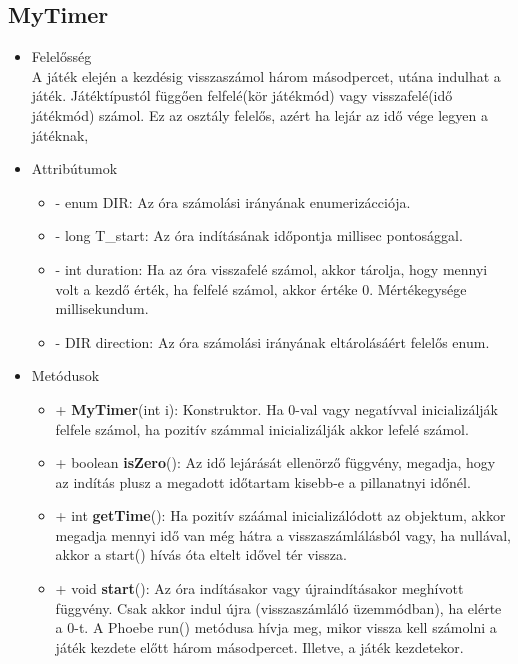 \subsection{MyTimer}
\begin{itemize}
\item Felelősség\\
A játék elején a kezdésig visszaszámol három másodpercet, utána indulhat a játék. Játéktípustól függően felfelé(kör játékmód) vagy visszafelé(idő játékmód) számol. Ez az osztály felelős, azért ha lejár az idő vége legyen a játéknak,
\item Attribútumok
    \begin{itemize}
        \item - enum DIR: Az óra számolási irányának enumerizácciója.
        \item - long T\_start: Az óra indításának időpontja millisec pontosággal.
	    \item - int duration: Ha az óra visszafelé számol, akkor tárolja, hogy mennyi volt a kezdő érték, ha felfelé számol, akkor értéke 0. Mértékegysége millisekundum.
	    \item - DIR direction: Az óra számolási irányának eltárolásáért felelős enum.
    \end{itemize}
\item Metódusok
	\begin{itemize}
		\item + \textbf{MyTimer}(int i): Konstruktor. Ha 0-val vagy negatívval inicializálják felfele számol, ha pozitív számmal inicializálják akkor lefelé számol.
		\item + boolean \textbf{isZero}(): Az idő lejárását ellenörző függvény, megadja, hogy az indítás plusz a megadott időtartam kisebb-e a pillanatnyi időnél.
		\item + int \textbf{getTime}():  Ha pozitív száámal inicializálódott az objektum, akkor megadja mennyi idő van még hátra a visszaszámlálásból vagy, ha nullával, akkor a start() hívás óta eltelt idővel tér vissza.
		\item + void \textbf{start}(): Az óra indításakor vagy újraindításakor meghívott függvény. Csak akkor indul újra (visszaszámláló üzemmódban), ha elérte a 0-t. A Phoebe run() metódusa hívja meg, mikor vissza kell számolni a játék kezdete előtt három másodpercet. Illetve, a játék kezdetekor.
	\end{itemize}
\end{itemize}

